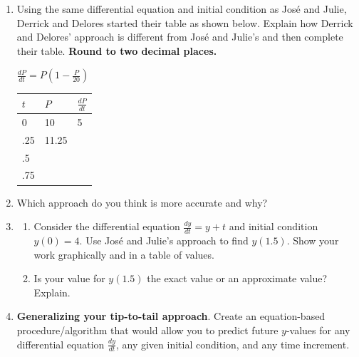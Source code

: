 \begin{enumerate}[resume]
\item	Using the same differential equation and initial condition as Jos{\'e} and Julie, Derrick and Delores started their table as shown below. Explain how Derrick and Delores' approach is different from Jos{\'e} and Julie's and then complete their table. \textbf{Round to two decimal places.} \label{03problem6}

{
$\displaystyle  \frac{dP}{dt}=P\left( 1-\frac{P}{20}\right) $
 
\renewcommand{\arraystretch}{1.5}
%
\begin{tabularx}{.4\textwidth}{ |R|R|R| }
\hline
$t$ & $P$ & $\frac{dP}{dt}$\\ & 10 & 5\\\hline
.25 & 11.25 & \\\hline
.5&&\\\hline
.75&&\\\hline
\end{tabularx}}
\vfill

\item Which approach do you think is more accurate and why? \label{03problem7}
\vfill

\clearpage

\item
\begin{enumerate}
\item Consider the differential equation $\displaystyle\frac{dy}{dt}=y+t$ and initial condition $y(0) = 4$. Use Jos{\'e} and Julie's approach to find $y(1.5)$. Show your work graphically and in a table of values. \label{03problem8parta}
\vfill
\vfill
\item Is your value for $y(1.5)$ the exact value or an approximate value? Explain. \label{03problem8partb}
\vfill
\end{enumerate}
\item	\textbf{Generalizing your tip-to-tail approach}. Create an equation-based procedure/algorithm that would allow you to predict future $y$-values for any differential equation $\displaystyle\frac{dy}{dt}$, any given initial condition, and any time increment. \label{03problem9} \vfill \vfill

\end{enumerate}

